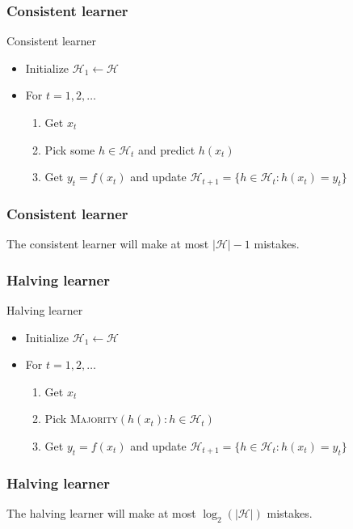 \documentclass[10pt]{beamer}
\begin{document}
\begin{frame}
  \frametitle{Consistent learner}
  \begin{block}{Consistent learner}
	\begin{itemize}
	\item Initialize $\mathcal{H}_1 \gets \mathcal{H}$
	\item For $t=1,2,\ldots$
	\begin{enumerate}
	\item Get $x_t$
	\item Pick some $h\in\mathcal{H}_t$ and predict $h(x_t)$
	\item Get $y_t=f(x_t)$ and update $\mathcal{H}_{t+1}=\{h\in\mathcal{H}_t:h(x_t)=y_t\}$
	\end{enumerate}
	\end{itemize}
  \end{block}
\end{frame}

\begin{frame}
  \frametitle{Consistent learner}
  \begin{theorem}
	The consistent learner will make at most $|\mathcal{H}|-1$ mistakes.
  \end{theorem}
\end{frame}

\begin{frame}
  \frametitle{Halving learner}
  \begin{block}{Halving learner}
	\begin{itemize}
	\item Initialize $\mathcal{H}_1 \gets \mathcal{H}$
	\item For $t=1,2,\ldots$
	\begin{enumerate}
	\item Get $x_t$
	\item Pick \textsc{Majority}$(h(x_t):h\in\mathcal{H}_t)$
	\item Get $y_t=f(x_t)$ and update $\mathcal{H}_{t+1}=\{h\in\mathcal{H}_t:h(x_t)=y_t\}$
	\end{enumerate}
	\end{itemize}
  \end{block}
\end{frame}

\begin{frame}
  \frametitle{Halving learner}
  \begin{theorem}
	The halving learner will make at most $\log_2(|\mathcal{H}|)$ mistakes.
  \end{theorem}
\end{frame}
\end{document}
